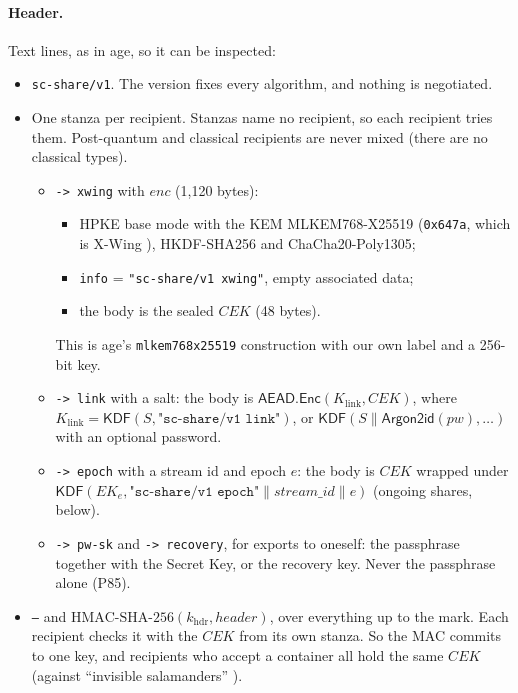 \documentclass[11pt,a4paper]{article}
\newcommand{\concat}{\mathbin{\|}}
\newcommand{\KDF}{\mathsf{KDF}}
\newcommand{\AEAD}{\mathsf{AEAD}}
\newcommand{\Enc}{\mathsf{Enc}}
\newcommand{\Argon}{\mathsf{Argon2id}}
\newcommand{\str}[1]{\texttt{"#1"}}
\newcommand{\dref}[1]{\textsf{#1}} %
\begin{document}
\paragraph{Header.} Text lines, as in age, so it can be inspected:
\begin{itemize}
  \item \texttt{sc-share/v1}. The version fixes every algorithm, and nothing is negotiated.
  \item One stanza per recipient. Stanzas name no recipient, so each recipient tries them. Post-quantum and classical recipients are never mixed (there are no classical types).
  \begin{itemize}
    \item \texttt{-> xwing} with $\mathit{enc}$ (1{,}120 bytes):
    \begin{itemize}
      \item HPKE base mode \cite{rfc9180} with the KEM MLKEM768-X25519 (\texttt{0x647a}, which is X-Wing \cite{hpkepq,xwingdraft}), HKDF-SHA256 and ChaCha20-Poly1305;
      \item \texttt{info} = \str{sc-share/v1 xwing}, empty associated data;
      \item the body is the sealed $\mathit{CEK}$ (48 bytes).
    \end{itemize}
    This is age's \texttt{mlkem768x25519} construction with our own label and a 256-bit key.
    \item \texttt{-> link} with a salt: the body is $\AEAD.\Enc(K_{\mathrm{link}}, \mathit{CEK})$, where $K_{\mathrm{link}} = \KDF(S, \str{sc-share/v1 link})$, or $\KDF(S \concat \Argon(\mathit{pw}), \ldots)$ with an optional password.
    \item \texttt{-> epoch} with a stream id and epoch $e$: the body is $\mathit{CEK}$ wrapped under $\KDF(\mathit{EK}_e, \str{sc-share/v1 epoch} \concat \mathit{stream\_id} \concat e)$ (ongoing shares, below).
    \item \texttt{-> pw-sk} and \texttt{-> recovery}, for exports to oneself: the passphrase together with the Secret Key, or the recovery key. Never the passphrase alone (\dref{P85}).
  \end{itemize}
  \item \texttt{---} and $\mathrm{HMAC\text{-}SHA\text{-}256}(k_{\mathrm{hdr}}, \mathit{header})$, over everything up to the mark. Each recipient checks it with the $\mathit{CEK}$ from its own stanza. So the MAC commits to one key, and recipients who accept a container all hold the same $\mathit{CEK}$ (against ``invisible salamanders'' \cite{albertini}).
\end{itemize}
\end{document}
